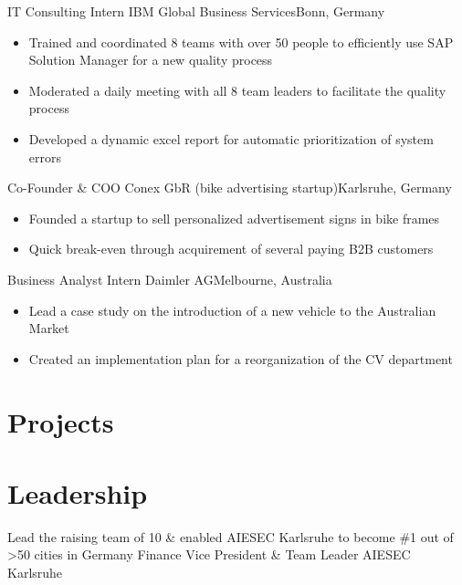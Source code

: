 \documentclass{my_cv}
\begin{document}
{IT Consulting Intern}
{IBM Global Business Services}{Bonn, Germany}
{}
{
\begin{itemize}
\item Trained and coordinated 8 teams with over 50 people to efficiently use SAP Solution Manager for a new quality process
\item Moderated a daily meeting with all 8 team leaders to facilitate the quality process
\item Developed a dynamic excel report for automatic prioritization of system errors
\end{itemize}
}  %

{Co-Founder \& COO}
{Conex GbR (bike advertising startup)}{Karlsruhe, Germany}
{}
{
\begin{itemize}
\item Founded a startup to sell personalized advertisement signs in bike frames
\item Quick break-even through acquirement of several paying B2B customers
\end{itemize}
}  %

{Business Analyst Intern}
{Daimler AG}{Melbourne, Australia}
{}
{
\begin{itemize}
\item Lead a case study on the introduction of a new vehicle to the Australian Market
\item Created an implementation plan for a reorganization of the CV department
\end{itemize}
}  %

\section{Projects}

\section{Leadership}
 \cventry{}
 {Lead the raising team of 10 \& enabled AIESEC Karlsruhe to become \#1 out of >50 cities in Germany}
 {Finance Vice President \& Team Leader}
 {AIESEC Karlsruhe}
 {}{} 
\end{document}

